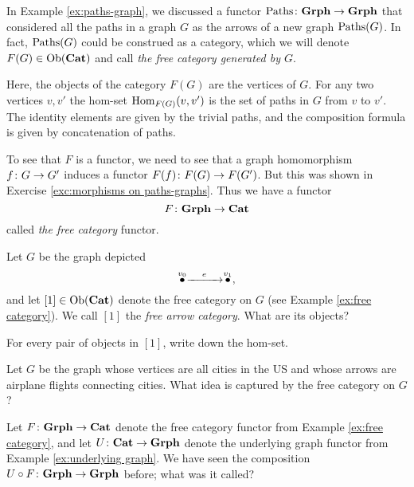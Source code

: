 \documentclass[CT4S-EN-RU]{subfiles}
\begin{document}
\begin{example}\label{ex:free category}

In Example \ref{ex:paths-graph}, we discussed a functor $\textnormal{Paths}\colon{\bf Grph}\rightarrow{\bf Grph}$ that considered all the paths in a graph $G$ as the arrows of a new graph $\textnormal{Paths}(G)$. In fact, $\textnormal{Paths}(G)$ could be construed as a category, which we will denote $F(G)\in\textnormal{Ob}({\bf Cat})$ and call {\em the free category generated by $G$}. 

Here, the objects of the category $F(G)$ are the vertices of $G$. For any two vertices $v,v'$ the hom-set $\textnormal{Hom}_{F(G)}(v,v')$ is the set of paths in $G$ from $v$ to $v'$. The identity elements are given by the trivial paths, and the composition formula is given by concatenation of paths. 

To see that $F$ is a functor, we need to see that a graph homomorphism $f\colon G\rightarrow G'$ induces a functor $F(f)\colon F(G)\rightarrow F(G')$. But this was shown in Exercise \ref{exc:morphisms on paths-graphs}. Thus we have a functor $$F\colon{\bf Grph}\rightarrow{\bf Cat}$$ called {\em the free category} functor.

\end{example}

\begin{exercise}\label{exc:[1]}
Let $G$ be the graph depicted $$\stackrel{v_0}{\bullet}\xrightarrow{\ \ \;\;e\;\;\ \ }\stackrel{v_1}{\bullet},$$ and let $[1]\in\textnormal{Ob}({\bf Cat})$ denote the free category on $G$ (see Example \ref{ex:free category}). We call $[1]$ the {\em free arrow category}.
\sexc What are its objects?
\item For every pair of objects in $[1]$, write down the hom-set.
\endsexc
\end{exercise}

\begin{exercise}
Let $G$ be the graph whose vertices are all cities in the US and whose arrows are airplane flights connecting cities. What idea is captured by the free category on $G$?
\end{exercise}

\begin{exercise}\label{exc:free underlying cat grph}
Let $F\colon{\bf Grph}\rightarrow{\bf Cat}$ denote the free category functor from Example \ref{ex:free category}, and let $U\colon{\bf Cat}\rightarrow{\bf Grph}$ denote the underlying graph functor from Example \ref{ex:underlying graph}. We have seen the composition $U\circ F\colon{\bf Grph}\rightarrow{\bf Grph}$ before; what was it called?
\end{exercise}
\end{document}

